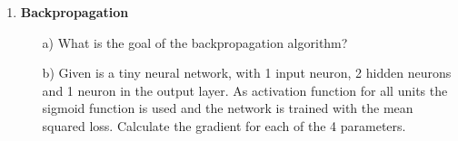 \documentclass[paper=a4, fontsize=11pt]{scrartcl} %
\numberwithin{equation}{section} %
\numberwithin{figure}{section} %
\numberwithin{table}{section} %
\begin{document}
\begin{enumerate}
   
\item \textbf{Backpropagation}\\
\begin{itemize}
\item[a)] What is the goal of the backpropagation algorithm? 
\item[b)]Given is a tiny neural network, with 1 input neuron, 2 hidden neurons and 1 neuron in the output layer. As activation function for all units the sigmoid function is used  and the network is trained with the mean squared loss. Calculate the gradient for each of the 4 parameters.
\end{itemize}
  
\end{enumerate}


\end{document}
